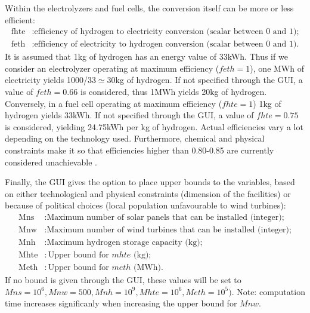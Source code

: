 \documentclass[english]{article}
\numberwithin{definition}{section}
\numberwithin{theorem}{section}
\numberwithin{problem}{section}
\begin{document}
Within the electrolyzers and fuel cells, the conversion itself can be more or less efficient:
\begin{align*}
    \text{fhte} & : \text{efficiency of hydrogen to electricity conversion (scalar between 0 and 1);} \\ 
    \text{feth} & : \text{efficiency of electricity to hydrogen conversion (scalar between 0 and 1).}
\end{align*}
It is assumed that 1kg of hydrogen has an energy value of 33kWh. Thus if we consider an electrolyzer operating at maximum efficiency ($feth=1$), one MWh of electricity yields 1000/33$\simeq$30kg of hydrogen. If not specified through the GUI, a value of $feth=0.66$ is considered, thus 1MWh yields 20kg of hydrogen.
Conversely, in a fuel cell operating at maximum efficiency ($fhte=1$) 1kg of hydrogen yields 
33kWh. If not specified through the GUI, a value of $fhte=0.75$ is considered, yielding 24.75kWh 
per kg of hydrogen. Actual efficiencies vary a lot depending on the technology used. Furthermore, chemical
 and physical constraints make it so that efficiencies higher than 0.80-0.85 are currently considered 
 unachievable \cite{DAWOOD}.

Finally, the GUI gives the option to place upper bounds to the variables, based on either technological and physical constraints (dimension of the facilities) or because of political choices (local population unfavourable to wind turbines): 
\begin{align*}
    \text{Mns} & : \text{Maximum number of solar panels that can be installed (integer);} \\ 
    \text{Mnw} & : \text{Maximum number of wind turbines that can be installed (integer);} \\ 
    \text{Mnh} & : \text{Maximum hydrogen storage capacity (kg);}\\
    \text{Mhte} & : \text{Upper bound for \(mhte\) (kg)}; \\ 
    \text{Meth} & : \text{Upper bound for \(meth\) (MWh)}.
\end{align*}
If no bound is given through the GUI, these values will be set to $Mns=10^6, Mnw=500, Mnh=10^9, Mhte=10^6, Meth=10^5)$. Note: computation time increases significanly when increasing the upper bound for $Mnw$.
\end{document}
